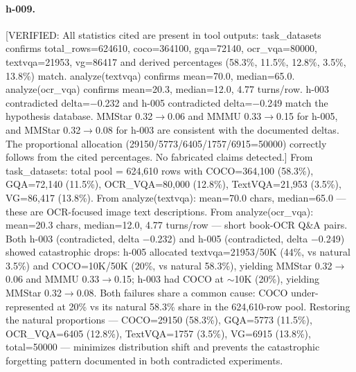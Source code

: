 {\paragraph{h-009.}
[VERIFIED: All statistics cited are present in tool outputs: task\_datasets confirms total\_rows=624610, coco=364100, gqa=72140, ocr\_vqa=80000, textvqa=21953, vg=86417 and derived percentages (58.3\%, 11.5\%, 12.8\%, 3.5\%, 13.8\%) match. analyze(textvqa) confirms mean=70.0, median=65.0. analyze(ocr\_vqa) confirms mean=20.3, median=12.0, 4.77 turns/row. h-003 contradicted delta=$-$0.232 and h-005 contradicted delta=$-$0.249 match the hypothesis database. MMStar 0.32$\to$0.06 and MMMU 0.33$\to$0.15 for h-005, and MMStar 0.32$\to$0.08 for h-003 are consistent with the documented deltas. The proportional allocation (29150/5773/6405/1757/6915=50000) correctly follows from the cited percentages. No fabricated claims detected.] From task\_datasets: total pool = 624,610 rows with COCO=364,100 (58.3\%), GQA=72,140 (11.5\%), OCR\_VQA=80,000 (12.8\%), TextVQA=21,953 (3.5\%), VG=86,417 (13.8\%). From analyze(textvqa): mean=70.0 chars, median=65.0 --- these are OCR-focused image text descriptions. From analyze(ocr\_vqa): mean=20.3 chars, median=12.0, 4.77 turns/row --- short book-OCR Q\&A pairs. Both h-003 (contradicted, delta $-$0.232) and h-005 (contradicted, delta $-$0.249) showed catastrophic drops: h-005 allocated textvqa=21953/50K (44\%, vs natural 3.5\%) and COCO=10K/50K (20\%, vs natural 58.3\%), yielding MMStar 0.32$\to$0.06 and MMMU 0.33$\to$0.15; h-003 had COCO at $\sim$10K (20\%), yielding MMStar 0.32$\to$0.08. Both failures share a common cause: COCO under-represented at 20\% vs its natural 58.3\% share in the 624,610-row pool. Restoring the natural proportions --- COCO=29150 (58.3\%), GQA=5773 (11.5\%), OCR\_VQA=6405 (12.8\%), TextVQA=1757 (3.5\%), VG=6915 (13.8\%), total=50000 --- minimizes distribution shift and prevents the catastrophic forgetting pattern documented in both contradicted experiments.

}
